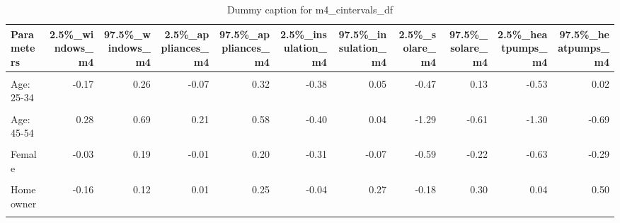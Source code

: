 \begin{table}
\centering
\caption{Dummy caption for m4_cintervals_df}
\centering
\fontsize{10}{12}\selectfont
\begin{tabular}[t]{lrrrrrrrrrr}
\toprule
Parameters & 2.5\%\_windows\_m4 & 97.5\%\_windows\_m4 & 2.5\%\_appliances\_m4 & 97.5\%\_appliances\_m4 & 2.5\%\_insulation\_m4 & 97.5\%\_insulation\_m4 & 2.5\%\_solare\_m4 & 97.5\%\_solare\_m4 & 2.5\%\_heatpumps\_m4 & 97.5\%\_heatpumps\_m4\\
\midrule
\cellcolor{gray!10}{Intercept} & \cellcolor{gray!10}{-4.13} & \cellcolor{gray!10}{-2.19} & \cellcolor{gray!10}{-0.65} & \cellcolor{gray!10}{0.55} & \cellcolor{gray!10}{-3.38} & \cellcolor{gray!10}{-1.59} & \cellcolor{gray!10}{-3.65} & \cellcolor{gray!10}{-0.59} & \cellcolor{gray!10}{-4.25} & \cellcolor{gray!10}{-1.46}\\
Age: 25-34 & -0.17 & 0.26 & -0.07 & 0.32 & -0.38 & 0.05 & -0.47 & 0.13 & -0.53 & 0.02\\
\cellcolor{gray!10}{Age: 35-44} & \cellcolor{gray!10}{0.05} & \cellcolor{gray!10}{0.46} & \cellcolor{gray!10}{0.03} & \cellcolor{gray!10}{0.41} & \cellcolor{gray!10}{-0.47} & \cellcolor{gray!10}{-0.03} & \cellcolor{gray!10}{-0.73} & \cellcolor{gray!10}{-0.12} & \cellcolor{gray!10}{-1.21} & \cellcolor{gray!10}{-0.58}\\
Age: 45-54 & 0.28 & 0.69 & 0.21 & 0.58 & -0.40 & 0.04 & -1.29 & -0.61 & -1.30 & -0.69\\
\cellcolor{gray!10}{Age: 55+} & \cellcolor{gray!10}{0.79} & \cellcolor{gray!10}{1.14} & \cellcolor{gray!10}{0.38} & \cellcolor{gray!10}{0.71} & \cellcolor{gray!10}{0.00} & \cellcolor{gray!10}{0.36} & \cellcolor{gray!10}{-0.93} & \cellcolor{gray!10}{-0.40} & \cellcolor{gray!10}{-1.02} & \cellcolor{gray!10}{-0.52}\\
Female & -0.03 & 0.19 & -0.01 & 0.20 & -0.31 & -0.07 & -0.59 & -0.22 & -0.63 & -0.29\\
\cellcolor{gray!10}{Higher education} & \cellcolor{gray!10}{0.02} & \cellcolor{gray!10}{0.24} & \cellcolor{gray!10}{-0.08} & \cellcolor{gray!10}{0.13} & \cellcolor{gray!10}{0.07} & \cellcolor{gray!10}{0.33} & \cellcolor{gray!10}{0.09} & \cellcolor{gray!10}{0.48} & \cellcolor{gray!10}{-0.05} & \cellcolor{gray!10}{0.32}\\
Homeowner & -0.16 & 0.12 & 0.01 & 0.25 & -0.04 & 0.27 & -0.18 & 0.30 & 0.04 & 0.50\\
\cellcolor{gray!10}{D-Type: House} & \cellcolor{gray!10}{-0.12} & \cellcolor{gray!10}{0.17} & \cellcolor{gray!10}{-0.02} & \cellcolor{gray!10}{0.23} & \cellcolor{gray!10}{0.00} & \cellcolor{gray!10}{0.30} & \cellcolor{gray!10}{-0.42} & \cellcolor{gray!10}{0.05} & \cellcolor{gray!10}{-0.35} & \cellcolor{gray!10}{0.09}\\

\end{tabular}
\end{table}
